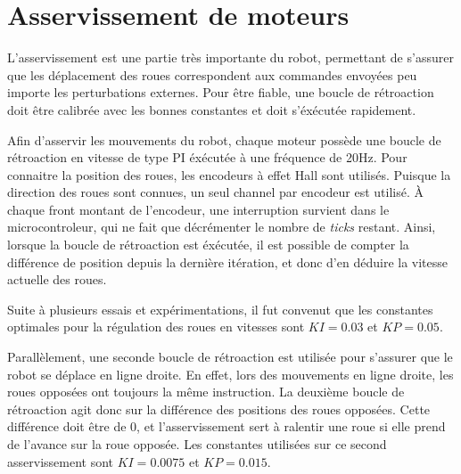 \section{Asservissement de moteurs}

L'asservissement est une partie très importante du robot, permettant de s'assurer que les déplacement des roues correspondent aux commandes envoyées peu importe les perturbations externes. Pour être fiable, une boucle de rétroaction doit être calibrée avec les bonnes constantes et doit s'éxécutée rapidement.

Afin d'asservir les mouvements du robot, chaque moteur possède une boucle de rétroaction en vitesse de type PI éxécutée à une fréquence de 20Hz. Pour connaitre la position des roues, les encodeurs à effet Hall sont utilisés. Puisque la direction des roues sont connues, un seul channel par encodeur est utilisé. À chaque front montant de l'encodeur, une interruption survient dans le microcontroleur, qui ne fait que décrémenter le nombre de \textit{ticks} restant. Ainsi, lorsque la boucle de rétroaction est éxécutée, il est possible de compter la différence de position depuis la dernière itération, et donc d'en déduire la vitesse actuelle des roues. 

Suite à plusieurs essais et expérimentations, il fut convenut que les constantes optimales pour la régulation des roues en vitesses sont $KI = 0.03$ et $KP = 0.05$. 

Parallèlement, une seconde boucle de rétroaction est utilisée pour s'assurer que le robot se déplace en ligne droite. En effet, lors des mouvements en ligne droite, les roues opposées ont toujours la même instruction. La deuxième boucle de rétroaction agit donc sur la différence des positions des roues opposées. Cette différence doit être de 0, et l'asservissement sert à ralentir une roue si elle prend de l'avance sur la roue opposée. Les constantes utilisées sur ce second asservissement sont $KI = 0.0075$ et $KP = 0.015$.